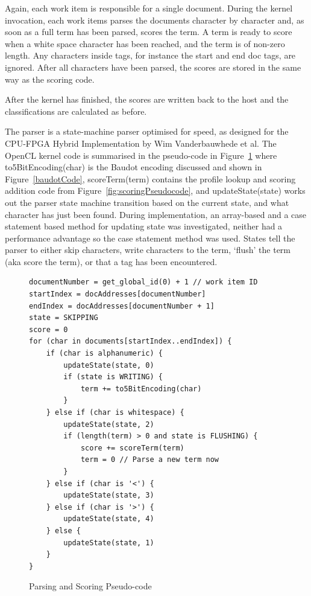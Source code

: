 Again, each work item is responsible for a single document. During the kernel
invocation, each work items parses the documents character by character and, as
soon as a full term has been parsed, scores the term. A term is ready to score
when a white space character has been reached, and the term is of non-zero
length. Any characters inside tags, for instance the start and end doc tags, are
ignored. After all characters have been parsed, the scores are stored in the
same way as the scoring code.

After the kernel has finished, the scores are written back to the host and the
classifications are calculated as before.

The parser is a state-machine parser optimised for speed, as designed for the
CPU-FPGA Hybrid Implementation \cite{HybridCPUFPGA} by Wim Vanderbauwhede et al.
The OpenCL kernel code is summarised in the pseudo-code in
Figure~\ref{fig:parsingScoringPseudocode} where to5BitEncoding(char) is the
Baudot encoding discussed and shown in Figure~\ref{baudotCode}, scoreTerm(term)
contains the profile lookup and scoring addition code from
Figure~\ref{fig:scoringPseudocode}, and updateState(state) works out the parser
state machine transition based on the current state, and what character has just
been found. During implementation, an array-based and a case statement based
method for updating state was investigated, neither had a performance advantage
so the case statement method was used. States tell the parser to either skip
characters, write characters to the term, `flush' the term (aka score the term),
or that a tag has been encountered.

\begin{figure}
\small\begin{verbatim}
documentNumber = get_global_id(0) + 1 // work item ID
startIndex = docAddresses[documentNumber]
endIndex = docAddresses[documentNumber + 1]
state = SKIPPING
score = 0
for (char in documents[startIndex..endIndex]) {
    if (char is alphanumeric) {
        updateState(state, 0)
        if (state is WRITING) {
            term += to5BitEncoding(char)
        }
    } else if (char is whitespace) {
        updateState(state, 2)
        if (length(term) > 0 and state is FLUSHING) {
            score += scoreTerm(term)
            term = 0 // Parse a new term now
        }
    } else if (char is '<') {
        updateState(state, 3)
    } else if (char is '>') {
        updateState(state, 4)
    } else {
        updateState(state, 1)
    }
}
\end{verbatim}
\caption{Parsing and Scoring Pseudo-code}
\label{fig:parsingScoringPseudocode}
\end{figure}

